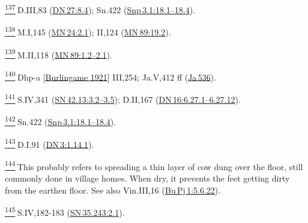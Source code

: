 \label{footprints_split_024.html_fn137}
\hyperref[footprints_split_008.htmlux5cux23fnref137]{\textsuperscript{137}} D.III,83
(\href{https://suttacentral.net/dn27/en/sujato\#8.4}{DN\,27:8.4});
Sn.422
(\href{https://suttacentral.net/snp3.1/en/sujato\#18.1}{Snp\,3.1:18.1--18.4}).

\label{footprints_split_024.html_fn138}
\hyperref[footprints_split_008.htmlux5cux23fnref138]{\textsuperscript{138}} M.I,145
(\href{https://suttacentral.net/mn24/en/sujato\#2.1}{MN\,24:2.1});
II,124
(\href{https://suttacentral.net/mn89/en/sujato\#19.2}{MN\,89:19.2}).

\label{footprints_split_024.html_fn139}
\hyperref[footprints_split_008.htmlux5cux23fnref139]{\textsuperscript{139}} M.II,118
(\href{https://suttacentral.net/mn89/en/sujato\#1.2}{MN\,89:1.2--2.1}).

\label{footprints_split_024.html_fn140}
\hyperref[footprints_split_008.htmlux5cux23fnref140]{\textsuperscript{140}} {Dhp-a
{{[}\hyperref[footprints_split_023.htmlux5cux23Burlingameux5cux25201921]{Burlingame
1921}{]}}} III,254; Ja.V,412 ff
(\href{https://suttacentral.net/ja536}{Ja\,536}).

\label{footprints_split_024.html_fn141}
\hyperref[footprints_split_008.htmlux5cux23fnref141]{\textsuperscript{141}} S.IV,341
(\href{https://suttacentral.net/sn42.13/en/sujato\#3.2}{SN\,42.13:3.2--3.5});
D.II,167
(\href{https://suttacentral.net/dn16/en/sujato\#6.27.1}{DN\,16:6.27.1--6.27.12}).

\label{footprints_split_024.html_fn142}
\hyperref[footprints_split_008.htmlux5cux23fnref142]{\textsuperscript{142}} Sn.422
(\href{https://suttacentral.net/snp3.1/en/sujato\#18.1}{Snp\,3.1:18.1--18.4}).

\label{footprints_split_024.html_fn143}
\hyperref[footprints_split_008.htmlux5cux23fnref143]{\textsuperscript{143}} D.I,91
(\href{https://suttacentral.net/dn3/en/sujato\#1.14.1}{DN\,3:1.14.1}).

\label{footprints_split_024.html_fn144}
\hyperref[footprints_split_008.htmlux5cux23fnref144]{\textsuperscript{144}} This
probably refers to spreading a thin layer of cow dung over the floor,
still commonly done in village homes. When dry, it prevents the feet
getting dirty from the earthen floor. See also Vin.III,16
(\href{https://suttacentral.net/pli-tv-bu-vb-pj1/en/brahmali\#5.6.22}{Bu\,Pj\,1:5.6.22}).

\label{footprints_split_024.html_fn145}
\hyperref[footprints_split_008.htmlux5cux23fnref145]{\textsuperscript{145}} S.IV,182-183
(\href{https://suttacentral.net/sn35.243/en/sujato\#2.1}{SN\,35.243:2.1}).

